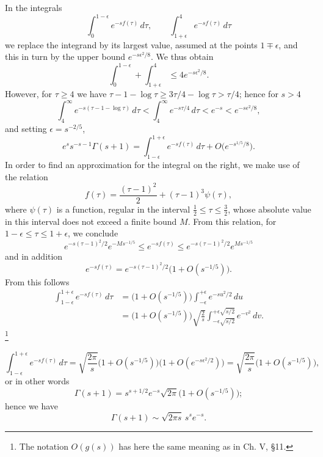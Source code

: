 In the integrals
\[
\int_0^{1-\epsilon}e^{-sf(\tau)}\,d\tau,
\qquad
\int_{1+\epsilon}^{4}e^{-sf(\tau)}\,d\tau
\]
we replace the integrand by its largest value, assumed at the points $1\mp\epsilon$, and this in turn by the upper bound $e^{-s\epsilon^2/8}$. We thus obtain
\[
\int_0^{1-\epsilon}+\int_{1+\epsilon}^{4}\le4e^{-s\epsilon^2/8}.
\]
However, for $\tau\ge4$ we have $\tau-1-\log\tau\ge3\tau/4-\log\tau>\tau/4$; hence for $s>4$
\[
\int_4^\infty e^{-s(\tau-1-\log\tau)}\,d\tau
<\int_4^\infty e^{-s\tau/4}\,d\tau<e^{-s}<e^{-s\epsilon^2/8},
\]
and setting $\epsilon=s^{-2/5}$,
\[
e^s s^{-s-1}\Gamma(s+1)
=\int_{1-\epsilon}^{1+\epsilon}e^{-sf(\tau)}\,d\tau
+O\bigl(e^{-s^{1/5}/8}\bigr).
\]
In order to find an approximation for the integral on the right, we make use of the relation
\[
f(\tau)=\frac{(\tau-1)^2}{2}+(\tau-1)^3\psi(\tau),
\]
where $\psi(\tau)$ is a function, regular in the interval $\tfrac12\le\tau\le\tfrac32$, whose absolute value in this interval does not exceed a finite bound $M$. From this relation, for $1-\epsilon\le\tau\le1+\epsilon$, we conclude
\[
e^{-s(\tau-1)^2/2}e^{-Ms^{-1/5}}
\le e^{-sf(\tau)}\le
 e^{-s(\tau-1)^2/2}e^{Ms^{-1/5}}
\]
and in addition
\[
e^{-sf(\tau)}=e^{-s(\tau-1)^2/2}\bigl(1+O(s^{-1/5})\bigr).
\]
From this follows
\begin{align*}
\int_{1-\epsilon}^{1+\epsilon}e^{-sf(\tau)}\,d\tau
&=\bigl(1+O(s^{-1/5})\bigr)\int_{-\epsilon}^{+\epsilon}e^{-su^2/2}\,du\\
&=\bigl(1+O(s^{-1/5})\bigr)\sqrt{\frac2s}
\int_{-\epsilon\sqrt{s/2}}^{+\epsilon\sqrt{s/2}}e^{-v^2}\,dv.
\end{align*}
\footnote{The notation $O(g(s))$ has here the same meaning as in Ch. V, \S11.}

\[
\int_{1-\epsilon}^{1+\epsilon}e^{-sf(\tau)}\,d\tau
=\sqrt{\frac{2\pi}{s}}\bigl(1+O(s^{-1/5})\bigr)
\bigl(1+O(e^{-s\epsilon^2/2})\bigr)
=\sqrt{\frac{2\pi}{s}}\bigl(1+O(s^{-1/5})\bigr),
\]
or in other words
\begin{equation}\tag{85}
\Gamma(s+1)=s^{s+1/2}e^{-s}\sqrt{2\pi}\bigl(1+O(s^{-1/5})\bigr);
\end{equation}
hence we have
\begin{equation}\tag{86}
\Gamma(s+1)\sim\sqrt{2\pi s}\,s^se^{-s}.
\end{equation}

